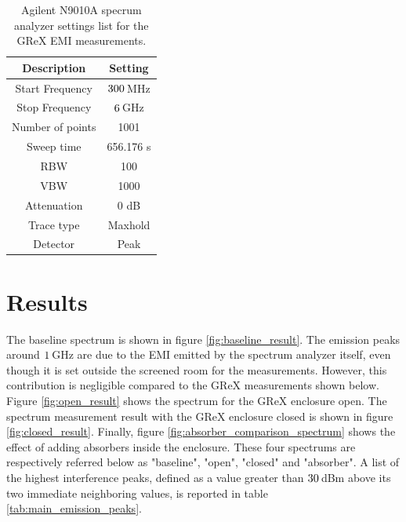 \documentclass[12pt,a4paper,oneside]{article}
\begin{document}
\begin{table}[]
    \centering
   
    \begin{tabular}{|c|c|}
    \hline
         \cellcolor[gray]{0.85} Description & \cellcolor[gray]{0.85} Setting \\ \hline
          Start Frequency & $300\thinspace$MHz \\ \hline
          Stop Frequency & $6\thinspace$GHz \\ \hline
          Number of points & 1001 \\ \hline
          Sweep time & 656.176 s\\ \hline
          RBW & 100 \\ \hline
          VBW & 1000 \\ \hline
          Attenuation & 0 dB\\ \hline
          Trace type & Maxhold \\ \hline
          Detector & Peak \\ \hline         
    \end{tabular}
    \caption{ Agilent N9010A specrum analyzer settings list for the GReX EMI measurements.}
    \label{tab:spectrum_analyzer_settings}
\end{table}
\section{Results}
\label{sec:Results}

The baseline spectrum is shown in figure \ref{fig:baseline_result}. The emission peaks around $1\thinspace$GHz are due to the EMI emitted by the spectrum analyzer itself, even though it is set outside the screened room for the measurements. However, this contribution is negligible compared to the GReX measurements shown below. Figure \ref{fig:open_result} shows the spectrum for the GReX enclosure open. The spectrum measurement result with the GReX enclosure closed is shown in figure \ref{fig:closed_result}. Finally, figure \ref{fig:absorber_comparison_spectrum} shows the effect of adding absorbers inside the enclosure. These four spectrums are respectively referred below as "baseline", "open", "closed" and "absorber". A list of the highest interference peaks, defined as a value greater than $30\thinspace$dBm above its two immediate neighboring values, is reported in table \ref{tab:main_emission_peaks}.
\end{document}
